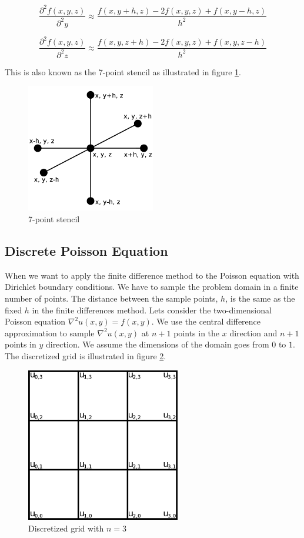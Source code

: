 $$\frac{\partial^2 f(x, y, z)}{\partial^2 y} \approx \frac{f(x, y+h, z) - 2f(x, y, z) + f(x, y-h, z)}{h^2}$$

$$\frac{\partial^2 f(x, y, z)}{\partial^2 z} \approx \frac{f(x, y, z+h) - 2f(x, y, z) + f(x, y, z-h)}{h^2}$$

This is also known as the 7-point stencil as illustrated in figure \ref{fig:7ps}.

\begin{figure}[ht]
	\center
	\includegraphics[width=0.5\textwidth]{images/7_point_stencil}
	\caption{7-point stencil}
	\label{fig:7ps}
\end{figure}

\subsection{Discrete Poisson Equation}

When we want to apply the finite difference method to the Poisson equation with 
Dirichlet boundary conditions.
We have to sample the problem domain in a finite number of points. The distance
between the sample points, $h$, is the same as the fixed $h$ in the finite
differences method. Lets consider the two-dimensional Poisson equation $\nabla^2
u(x, y) = f(x, y)$. We use the central difference approximation to sample
$\nabla^2 u(x, y)$ at $n+1$ points in the $x$ direction and $n+1$ points in $y$
direction. We assume the dimensions of the domain goes from $0$ to $1$. The discretized 
grid is illustrated in figure \ref{fig:discgrid}.

\begin{figure}[ht]
	\center
	\includegraphics[width=0.6\textwidth]{images/2d_poisson_ex}
	\caption{Discretized grid with $n = 3$}
	\label{fig:discgrid}
\end{figure}


